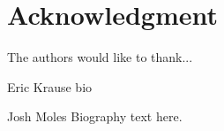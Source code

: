 \documentclass[journal]{IEEEtran}
\begin{document}
\section*{Acknowledgment}


The authors would like to thank...


\ifCLASSOPTIONcaptionsoff
  \newpage
\fi






%

%


% 

\begin{IEEEbiography}{Eric Krause}
bio
\end{IEEEbiography}

\begin{IEEEbiography}{Josh Moles}
Biography text here.
\end{IEEEbiography}
\end{document}
